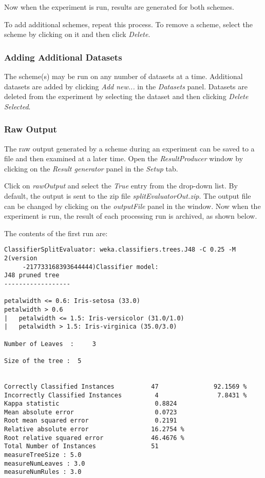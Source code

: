 Now when the experiment is run, results are generated for both schemes.

To add additional schemes, repeat this process. To remove a scheme, select the scheme by clicking on it and then click \textit{Delete}.


\subsubsection*{Adding Additional Datasets}

The scheme(s) may be run on any number of datasets at a time. Additional datasets are added by clicking \textit{Add new...} in the \textit{Datasets} panel. Datasets are deleted from the experiment by selecting the dataset and then clicking \textit{Delete Selected}.


\subsubsection*{Raw Output}

The raw output generated by a scheme during an experiment can be saved to a file and then examined at a later time. Open the \textit{ResultProducer} window by clicking on the \textit{Result generator} panel in the \textit{Setup} tab.
\begin{center}
\end{center}

Click on \textit{rawOutput} and select the \textit{True} entry from the drop-down list. By default, the output is sent to the zip file \textit{splitEvaluatorOut.zip}. The output file can be changed by clicking on the \textit{outputFile} panel in the window. Now when the experiment is run, the result of each processing run is archived, as shown below.
\begin{center}
\end{center}

The contents of the first run are:

\begin{verbatim}
ClassifierSplitEvaluator: weka.classifiers.trees.J48 -C 0.25 -M 2(version 
     -217733168393644444)Classifier model: 
J48 pruned tree
------------------

petalwidth <= 0.6: Iris-setosa (33.0)
petalwidth > 0.6
|   petalwidth <= 1.5: Iris-versicolor (31.0/1.0)
|   petalwidth > 1.5: Iris-virginica (35.0/3.0) 

Number of Leaves  : 	3

Size of the tree : 	5 


Correctly Classified Instances          47               92.1569 %
Incorrectly Classified Instances         4                7.8431 %
Kappa statistic                          0.8824
Mean absolute error                      0.0723
Root mean squared error                  0.2191
Relative absolute error                 16.2754 %
Root relative squared error             46.4676 %
Total Number of Instances               51     
measureTreeSize : 5.0
measureNumLeaves : 3.0
measureNumRules : 3.0
\end{verbatim}




